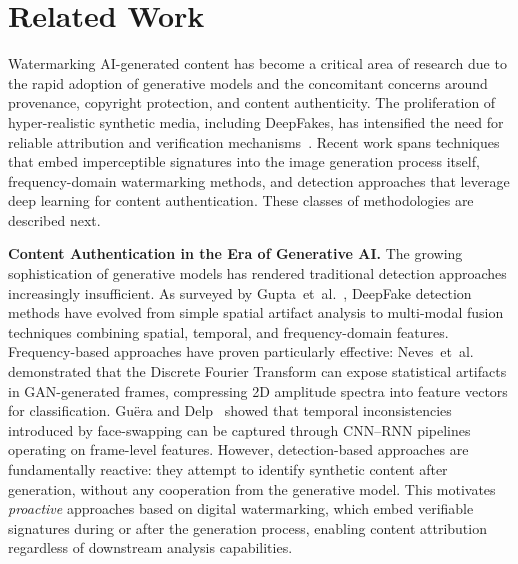 \section{Related Work}
\label{sec:rel_work}

Watermarking AI-generated content has become a critical area of research due to the rapid 
adoption of generative models and the concomitant concerns around provenance, copyright 
protection, and content authenticity. The proliferation of hyper-realistic synthetic media, 
including DeepFakes, has intensified the need for reliable attribution and verification 
mechanisms~\cite{gupta2024comprehensive, nguyen2022deep, verdoliva2020media}. 
Recent work spans techniques that embed imperceptible signatures into the image generation 
process itself, frequency-domain watermarking methods, and detection approaches that 
leverage deep learning for content authentication. These classes of methodologies are 
described next.

\noindent\textbf{Content Authentication in the Era of Generative AI.}
The growing sophistication of generative models has rendered traditional detection 
approaches increasingly insufficient. As surveyed by Gupta~et~al.~\cite{gupta2024comprehensive}, 
DeepFake detection methods have evolved from simple spatial artifact analysis to 
multi-modal fusion techniques combining spatial, temporal, and frequency-domain 
features. Frequency-based approaches have proven particularly effective: 
Neves~et~al.~\cite{neves2020ganprintr} demonstrated that the Discrete Fourier 
Transform can expose statistical artifacts in GAN-generated frames, compressing 
2D amplitude spectra into feature vectors for classification. 
Gu{\"e}ra and Delp~\cite{guera2018deepfake} showed that temporal inconsistencies 
introduced by face-swapping can be captured through CNN--RNN pipelines operating 
on frame-level features.
However, detection-based approaches are fundamentally reactive: they attempt to identify 
synthetic content after generation, without any cooperation from the generative model. 
This motivates \emph{proactive} approaches based on digital watermarking, which embed 
verifiable signatures during or after the generation process, enabling content attribution 
regardless of downstream analysis capabilities.


